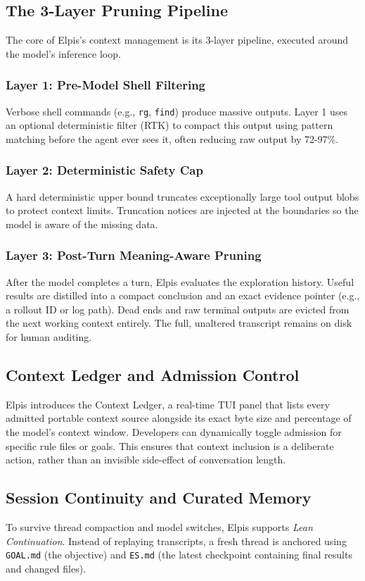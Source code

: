 \documentclass[conference]{IEEEtran}
\begin{document}
\subsection{The 3-Layer Pruning Pipeline}
The core of Elpis's context management is its 3-layer pipeline, executed around the model's inference loop.

\subsubsection{Layer 1: Pre-Model Shell Filtering}
Verbose shell commands (e.g., \texttt{rg}, \texttt{find}) produce massive outputs. Layer 1 uses an optional deterministic filter (RTK) to compact this output using pattern matching before the agent ever sees it, often reducing raw output by 72-97\%.

\subsubsection{Layer 2: Deterministic Safety Cap}
A hard deterministic upper bound truncates exceptionally large tool output blobs to protect context limits. Truncation notices are injected at the boundaries so the model is aware of the missing data.

\subsubsection{Layer 3: Post-Turn Meaning-Aware Pruning}
After the model completes a turn, Elpis evaluates the exploration history. Useful results are distilled into a compact conclusion and an exact evidence pointer (e.g., a rollout ID or log path). Dead ends and raw terminal outputs are evicted from the next working context entirely. The full, unaltered transcript remains on disk for human auditing.

\subsection{Context Ledger and Admission Control}
Elpis introduces the Context Ledger, a real-time TUI panel that lists every admitted portable context source alongside its exact byte size and percentage of the model's context window. Developers can dynamically toggle admission for specific rule files or goals. This ensures that context inclusion is a deliberate action, rather than an invisible side-effect of conversation length.

\subsection{Session Continuity and Curated Memory}
To survive thread compaction and model switches, Elpis supports \textit{Lean Continuation}. Instead of replaying transcripts, a fresh thread is anchored using \texttt{GOAL.md} (the objective) and \texttt{ES.md} (the latest checkpoint containing final results and changed files).
\end{document}
